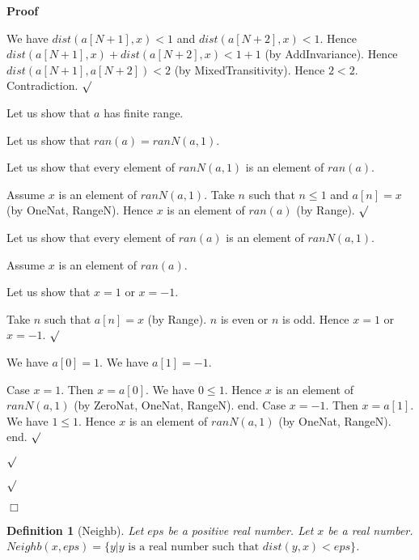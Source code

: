\documentclass{article}
\newenvironment{forthel}{\begin{leftbar}}{\end{leftbar}}
\newenvironment{proof}{\noindent\textbf{Proof\ }}{\hspace*{\fill}$\Box$\medskip}
\newenvironment{subproof}{\begin{list}{}{}
		\item[\text{Proof}]}{\hfill $\surd$ \end{list}}
\newtheorem{definition}{Definition}
\begin{document}
\begin{forthel}
\begin{proof}
\begin{subproof}
	We have $dist(a[N + 1],x) < 1$ and $dist(a[N + 2],x) < 1$.
	Hence $dist(a[N + 1],x) + dist(a[N + 2],x) < 1 + 1$ (by AddInvariance).
	Hence $dist(a[N + 1],a[N + 2]) < 2$ (by MixedTransitivity).
	Hence $2 < 2$.
	Contradiction.
	\end{subproof}
	
	Let us show that $a$ has finite range.
	\begin{subproof}
	Let us show that $ran(a) = ranN(a,1)$.
	\begin{subproof}
	Let us show that every element of $ranN(a,1)$ is an element of $ran(a)$.
	\begin{subproof}
	Assume $x$ is an element of $ranN(a,1)$.
	Take $n$ such that $n \leq 1$ and $a[n] = x$ (by OneNat, RangeN).
	Hence $x$ is an element of $ran(a)$ (by Range).
	\end{subproof}
	
	Let us show that every element of $ran(a)$ is an element of $ranN(a,1)$.
	\begin{subproof}
	Assume $x$ is an element of $ran(a)$.
	
	Let us show that $x = 1$ or $x = -1$.
	\begin{subproof}
	Take $n$ such that $a[n] = x$ (by Range).
	$n$ is even or $n$ is odd.
	Hence $x = 1$ or $x = -1$.
	\end{subproof}
	
	We have $a[0] = 1$.
	We have $a[1] = -1$.
	
	Case $x = 1$.
	Then $x = a[0]$.
	We have $0 \leq 1$.
	Hence $x$ is an element of $ranN(a,1)$ (by ZeroNat, OneNat, RangeN).
	end.
	Case $x = -1$.
	Then $x = a[1]$.
	We have $1 \leq 1$.
	Hence $x$ is an element of $ranN(a,1)$ (by OneNat, RangeN).
	end.
	\end{subproof}
	\end{subproof}
	\end{subproof}
	\end{proof}
	
	\begin{definition} [Neighb]
	Let $eps$ be a positive real number. Let $x$ be a real number.
	$Neighb(x,eps) = \{y | y \text{ is a real number such that } dist(y,x) < eps\}$.
	\end{definition}
	

\end{forthel}
\end{document}
